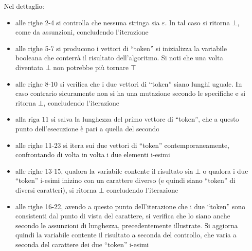 \documentclass[a4paper,12pt, oneside]{book}
\begin{document}
\newpage
Nel dettaglio:
\begin{itemize}
  \item alle righe 2-4 si controlla che nessuna stringa sia $\varepsilon$. In
  tal caso si ritorna $\bot$, come da assunzioni, concludendo l'iterazione
  \item alle righe 5-7 si producono i vettori di ``token'' si
  inizializza la variabile booleana che conterrà il risultato dell'algoritmo. Si
  noti che una volta diventata $\bot$ non potrebbe più tornare $\top$
  \item alle righe 8-10 si verifica che i due vettori di ``token'' siano lunghi
  uguale. In caso contrario sicuramente non si ha una mutazione secondo le
  specifiche e si ritorna $\bot$, concludendo l'iterazione
  \item alla riga 11 si salva la lunghezza del primo vettore di ``token'', che a
  questo punto dell'esecuzione è pari a quella del secondo
  \item alle righe 11-23 si itera sui due vettori di ``token''
  contemporaneamente, confrontando di volta in volta i due elementi i-esimi
  \item alle righe 13-15, qualora la variabile contente il risultato sia
  $\bot$ o qualora i due ``token'' i-esimi inizino con un carattere diverso (e
  quindi siano ``token'' di diversi caratteri), si ritorna $\bot$ concludendo
  l'iterazione
  \item alle righe 16-22, avendo a questo punto dell'iterazione che i due
  ``token'' sono consistenti dal punto di vista del carattere, si verifica che
  lo siano anche secondo le assunzioni di lunghezza, precedentemente illustrate.
  Si aggiorna quindi la variabile contente il risultato a seconda del controllo,
  che varia a seconda del carattere dei due ``token'' i-esimi
\end{itemize}
\end{document}
